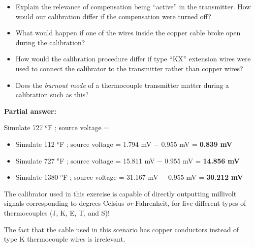 \begin{itemize}
\item{} Explain the relevance of compensation being ``active'' in the transmitter.  How would our calibration differ if the compensation were turned off?
\item{} What would happen if one of the wires inside the copper cable broke open during the calibration?
\item{} How would the calibration procedure differ if type ``KX'' extension wires were used to connect the calibrator to the transmitter rather than copper wires?
\item{} Does the {\it burnout mode} of a thermocouple transmitter matter during a calibration such as this?
\end{itemize}







\noindent
{\bf Partial answer:}

\vskip 10pt

\item{} Simulate 727 $^{o}$F ; source voltage = 







\begin{itemize}
\item{} Simulate 112 $^{o}$F ; source voltage = 1.794 mV $-$ 0.955 mV = {\bf 0.839 mV}
\vskip 10pt
\item{} Simulate 727 $^{o}$F ; source voltage = 15.811 mV $-$ 0.955 mV = {\bf 14.856 mV}
\vskip 10pt
\item{} Simulate 1380 $^{o}$F ; source voltage = 31.167 mV $-$ 0.955 mV = {\bf 30.212 mV}
\end{itemize}

\vskip 10pt

The calibrator used in this exercise is capable of directly outputting millivolt signals corresponding to degrees Celsius {\it or} Fahrenheit, for five different types of thermocouples (J, K, E, T, and S)!

\vskip 10pt

The fact that the cable used in this scenario has copper conductors instead of type K thermocouple wires is irrelevant.  




